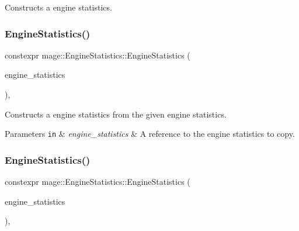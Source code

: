 Constructs a engine statistics. \hypertarget{classmage_1_1_engine_statistics_a6191d7a64cf2bb46a404a12e7cfafbb5}{}\label{classmage_1_1_engine_statistics_a6191d7a64cf2bb46a404a12e7cfafbb5} 
\subsubsection{\texorpdfstring{Engine\+Statistics()}{EngineStatistics()}\hspace{0.1cm}{\footnotesize\ttfamily [2/3]}}
{\footnotesize\ttfamily constexpr mage\+::\+Engine\+Statistics\+::\+Engine\+Statistics (\begin{DoxyParamCaption}\item[{const \hyperlink{classmage_1_1_engine_statistics}{Engine\+Statistics} \&}]{engine\+\_\+statistics }\end{DoxyParamCaption})\hspace{0.3cm}{\ttfamily [default]}, {\ttfamily [noexcept]}}

Constructs a engine statistics from the given engine statistics.


\begin{DoxyParams}[1]{Parameters}
\mbox{\tt in}  & {\em engine\+\_\+statistics} & A reference to the engine statistics to copy. \\
\hline
\end{DoxyParams}
\hypertarget{classmage_1_1_engine_statistics_ab68e329a6f614be99d773e026b2233de}{}\label{classmage_1_1_engine_statistics_ab68e329a6f614be99d773e026b2233de} 
\subsubsection{\texorpdfstring{Engine\+Statistics()}{EngineStatistics()}\hspace{0.1cm}{\footnotesize\ttfamily [3/3]}}
{\footnotesize\ttfamily constexpr mage\+::\+Engine\+Statistics\+::\+Engine\+Statistics (\begin{DoxyParamCaption}\item[{\hyperlink{classmage_1_1_engine_statistics}{Engine\+Statistics} \&\&}]{engine\+\_\+statistics }\end{DoxyParamCaption})\hspace{0.3cm}{\ttfamily [default]}, {\ttfamily [noexcept]}}


